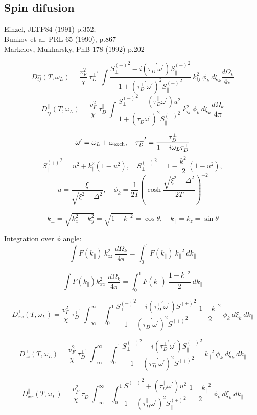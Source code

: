 \documentclass[a4paper]{article}
\begin{document}
\subsection*{Spin difusion}

\def\tdp{\tau_D^\perp}
\def\tdpa{\tau_D^\parallel}
\def\ol{\omega_L}
\def\oe{\omega_{\rm exch}}
\def\op{\omega^\prime}
\def\tp{{\tdp}^\prime}
\def\t{\tdpa}

\def\sm{{S_\perp^{(-)}}^2}
\def\sp{{S_\parallel^{(+)}}^2}

\def\kpe{{k_\perp}}
\def\kpa{{k_\parallel}}

\def\smx{{S_{xx}^{(-)}}^2}
\def\spz{{S_{zz}^{(+)}}^2}


Einzel, JLTP84 (1991) p.352;\\
Bunkov et al, PRL 65 (1990), p.867\\
Markelov, Mukharsky, PhB 178 (1992) p.202

$$
D^\perp_{ij}(T, \ol) =
  \frac{v_F^2}{\chi}\ \tp
  \  \int \frac{\sm - i(\tp\op)\sp}{1+(\tp\op)^2\sp}
  \  k_{ij}^2\ \phi_k\ d\xi_k\frac{d\Omega_k}{4\pi}
$$
$$
D^\parallel_{ij}(T, \ol) =
  \frac{v_F^2}{\chi}\ \t
  \  \int \frac{\sm + (\t\op)u^2 }{1+(\t\op)^2\sp}
  \  k_{ij}^2\ \phi_k\ d\xi_k\frac{d\Omega_k}{4\pi}
$$

$$
\op = \ol+\oe,\quad
\tp = \frac{\tdp}{1-i\ol\tdp}
$$
$$
\sp = u^2 + k_\parallel^2(1-u^2),\quad
\sm = 1-\frac{k_\perp^2}{2}(1-u^2),
$$
$$
u=\frac{\xi}{\sqrt{\xi^2+\Delta^2}}, \quad
\phi_k = \frac{1}{2T}\left(\cosh\frac{\sqrt{\xi^2+\Delta^2}}{2T}\right)^{-2}
$$

$$
k_\perp = \sqrt{k_x^2+k_y^2} = \sqrt{1-\kpa^2} = \cos\theta, \quad
k_\parallel = k_z = \sin\theta
$$

Integration over $\phi$ angle:
$$
\int F(\kpa)\ k_{zz}^2\ \frac{d\Omega_k}{4\pi} =
\int_0^1 F(\kpa)\ \kpa^2\ d\kpa
$$

$$
\int F(\kpa) k_{xx}^2\ \frac{d\Omega_k}{4\pi} =
\int_0^1 F(\kpa)\ \frac{1-\kpa^2}{2}\ d\kpa
$$


$$
D^\perp_{xx}(T, \ol) =
  \frac{v_F^2}{\chi}\ \tp
  \ \int_{-\infty}^{\infty}\ \int_{0}^{1}
  \frac{\sm - i(\tp\op)\sp}{1+(\tp\op)^2\sp}
  \ \frac{1-\kpa^2}{2}\ \phi_k\ d\xi_k\ d\kpa
$$

$$
D^\perp_{zz}(T, \ol) =
  \frac{v_F^2}{\chi}\ \tp
  \ \int_{-\infty}^{\infty}\ \int_{0}^{1}
  \frac{\sm - i(\tp\op)\sp}{1+(\tp\op)^2\sp}
  \ \kpa^2\ \phi_k\ d\xi_k\ d\kpa
$$

$$
D^\parallel_{xx}(T, \ol) =
  \frac{v_F^2}{\chi}\ \t
  \ \int_{-\infty}^{\infty}\ \int_{0}^{1}
  \frac{\sm + (\t\op)u^2 }{1+(\t\op)^2\sp}
  \  \frac{1-\kpa^2}{2}\ \phi_k\ d\xi_k\ d\kpa
$$
\end{document}

